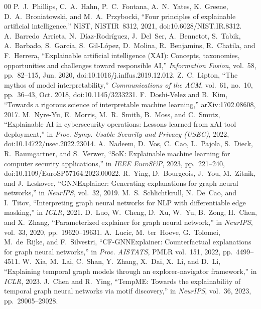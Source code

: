 \documentclass[conference]{IEEEtran}
\begin{document}
\begin{thebibliography}{00}
 P.~J.~Phillips, C.~A.~Hahn, P.~C.~Fontana, A.~N.~Yates, K.~Greene, D.~A.~Broniatowski, and M.~A.~Przybocki, ``Four principles of explainable artificial intelligence,'' NIST, NISTIR~8312, 2021, doi:10.6028/NIST.IR.8312.
 A.~Barredo~Arrieta, N.~D\'iaz-Rodr\'iguez, J.~Del~Ser, A.~Bennetot, S.~Tabik, A.~Barbado, S.~Garc\'ia, S.~Gil-L\'opez, D.~Molina, R.~Benjamins, R.~Chatila, and F.~Herrera, ``Explainable artificial intelligence (XAI): Concepts, taxonomies, opportunities and challenges toward responsible AI,'' \emph{Information Fusion}, vol.~58, pp.~82--115, Jun. 2020, doi:10.1016/j.inffus.2019.12.012.
 Z.~C.~Lipton, ``The mythos of model interpretability,'' \emph{Communications of the ACM}, vol.~61, no.~10, pp.~36--43, Oct. 2018, doi:10.1145/3233231.
 F.~Doshi-Velez and B.~Kim, ``Towards a rigorous science of interpretable machine learning,'' arXiv:1702.08608, 2017.
 M.~Nyre-Yu, E.~Morris, M.~R.~Smith, B.~Moss, and C.~Smutz, ``Explainable AI in cybersecurity operations: Lessons learned from xAI tool deployment,'' in \emph{Proc. Symp. Usable Security and Privacy (USEC)}, 2022, doi:10.14722/usec.2022.23014.
 A.~Nadeem, D.~Vos, C.~Cao, L.~Pajola, S.~Dieck, R.~Baumgartner, and S.~Verwer, ``SoK: Explainable machine learning for computer security applications,'' in \emph{IEEE EuroS\&P}, 2023, pp.~221--240, doi:10.1109/EuroSP57164.2023.00022.
 R.~Ying, D.~Bourgeois, J.~You, M.~Zitnik, and J.~Leskovec, ``GNNExplainer: Generating explanations for graph neural networks,'' in \emph{NeurIPS}, vol.~32, 2019.
 M.~S.~Schlichtkrull, N.~De~Cao, and I.~Titov, ``Interpreting graph neural networks for NLP with differentiable edge masking,'' in \emph{ICLR}, 2021.
 D.~Luo, W.~Cheng, D.~Xu, W.~Yu, B.~Zong, H.~Chen, and X.~Zhang, ``Parameterized explainer for graph neural network,'' in \emph{NeurIPS}, vol.~33, 2020, pp.~19620--19631.
 A.~Lucic, M.~ter~Hoeve, G.~Tolomei, M.~de~Rijke, and F.~Silvestri, ``CF-GNNExplainer: Counterfactual explanations for graph neural networks,'' in \emph{Proc. AISTATS}, PMLR vol.~151, 2022, pp.~4499--4511.
 W.~Xia, M.~Lai, C.~Shan, Y.~Zhang, X.~Dai, X.~Li, and D.~Li, ``Explaining temporal graph models through an explorer-navigator framework,'' in \emph{ICLR}, 2023.
 J.~Chen and R.~Ying, ``TempME: Towards the explainability of temporal graph neural networks via motif discovery,'' in \emph{NeurIPS}, vol.~36, 2023, pp.~29005--29028.

\end{thebibliography}
\end{document}
